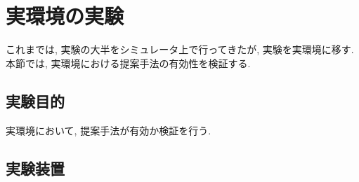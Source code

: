 
\section{実環境の実験}
これまでは, 実験の大半をシミュレータ上で行ってきたが, 実験を実環境に移す. 本節では, 実環境における提案手法の有効性を検証する.

\subsection{実験目的}
実環境において, 提案手法が有効か検証を行う.

\subsection{実験装置}
